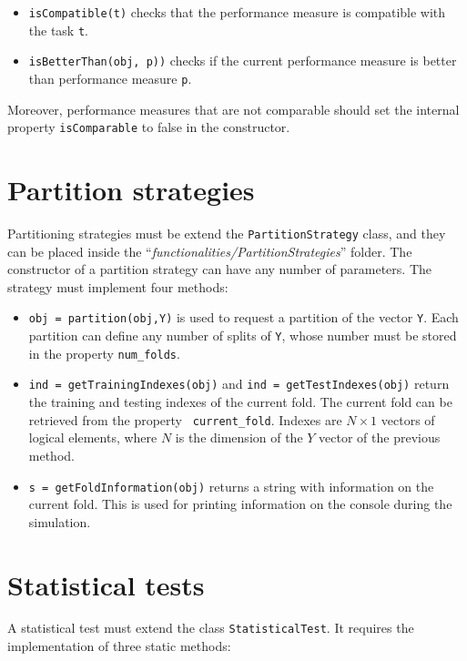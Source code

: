 \begin{itemize}
\item \verb|isCompatible(t)| checks that the performance measure is compatible with the task \verb|t|.
\item \verb|isBetterThan(obj, p))| checks if the current performance measure is better than performance measure \verb|p|.
\end{itemize}

Moreover, performance measures that are not comparable should set the internal property \verb|isComparable| to false in the constructor.

\section{Partition strategies}

Partitioning strategies must be extend the \verb|PartitionStrategy| class, and they can be placed inside the “\textit{functionalities/PartitionStrategies}” folder. The constructor of a partition strategy can have any number of parameters. The strategy must implement four methods:

\begin{itemize}

\item \verb|obj = partition(obj,Y)| is used to request a partition of the vector \verb|Y|. Each partition can define any number of splits of \verb|Y|, whose number must be stored in the property \verb|num_folds|.
\item \verb|ind = getTrainingIndexes(obj)| and \verb|ind = getTestIndexes(obj)| return the training and testing indexes of the current fold. The current fold can be retrieved from the property \verb| current_fold|. Indexes are $N \times 1$ vectors of logical elements, where $N$ is the dimension of the $Y$ vector of the previous method.
\item \verb|s = getFoldInformation(obj)| returns a string with information on
the current fold. This is used for printing information on the console during the simulation.
\end{itemize}

\section{Statistical tests}

A statistical test must extend the class \verb|StatisticalTest|. It requires the implementation of three static methods:

